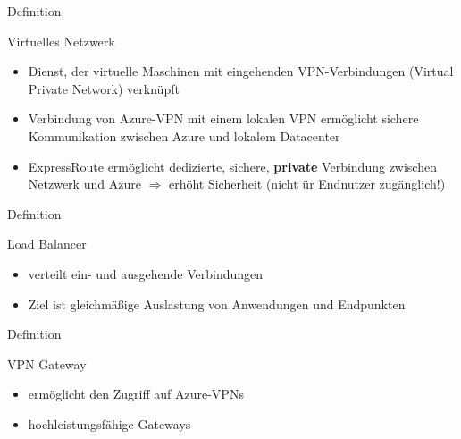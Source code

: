 \documentclass{scrartcl}
\newenvironment{flashcard}[2][]{%
    #1
    \vfill
    \centerline{\Large{#2}}
    \vfill
\newpage
}
{\newpage}
\begin{document}
    \begin{flashcard}[Definition]{Virtuelles Netzwerk}
        \begin{itemize}
            \item Dienst, der virtuelle Maschinen mit eingehenden VPN-Verbindungen (Virtual Private Network) verknüpft
            \item Verbindung von Azure-VPN mit einem lokalen VPN ermöglicht sichere Kommunikation zwischen Azure und lokalem Datacenter
            \item ExpressRoute ermöglicht dedizierte, sichere, \textbf{private} Verbindung zwischen Netzwerk und Azure\newline
            $\Rightarrow$ erhöht Sicherheit (nicht ür Endnutzer zugänglich!)
        \end{itemize}

    \end{flashcard}

    \begin{flashcard}[Definition]{Load Balancer}
        \begin{itemize}
            \item verteilt ein- und ausgehende Verbindungen
            \item Ziel ist gleichmäßige Auslastung von Anwendungen und Endpunkten
        \end{itemize}

    \end{flashcard}

    \begin{flashcard}[Definition]{VPN Gateway}
        \begin{itemize}
            \item ermöglicht den Zugriff auf Azure-VPNs
            \item hochleistungsfähige Gateways
        \end{itemize}

    \end{flashcard}
\end{document}
